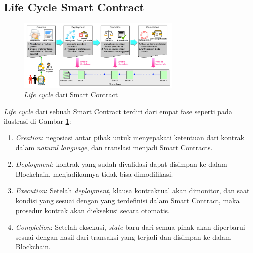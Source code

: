 \subsection{Life Cycle Smart Contract}
\label{subsec:lifecycle}

\begin{figure}[ht]
	\centering
	\includegraphics[width=0.7\textwidth]{resources/chapter-2/sc-lifecycle.png}
	\caption{\textit{Life cycle} dari Smart Contract \parencite{zheng2020overview}}
	\label{image:sc-lifecycle}
\end{figure}

\textit{Life cycle} dari sebuah Smart Contract terdiri dari empat fase seperti pada ilustrasi di Gambar \ref{image:sc-lifecycle}:

\begin{enumerate}
	\item \textit{Creation}: negosiasi antar pihak untuk menyepakati ketentuan dari kontrak dalam \textit{natural language}, dan translasi menjadi Smart Contracts.
	\item \textit{Deployment}: kontrak yang sudah divalidasi dapat disimpan ke dalam Blockchain, menjadikannya tidak bisa dimodifikasi.
	\item \textit{Execution}: Setelah \textit{deployment}, klausa kontraktual akan dimonitor, dan saat kondisi yang sesuai dengan yang terdefinisi dalam Smart Contract, maka prosedur kontrak akan dieksekusi secara otomatis.
	\item \textit{Completion}: Setelah eksekusi, \textit{state} baru dari semua pihak akan diperbarui sesuai dengan hasil dari transaksi yang terjadi dan disimpan ke dalam Blockchain. 
\end{enumerate}